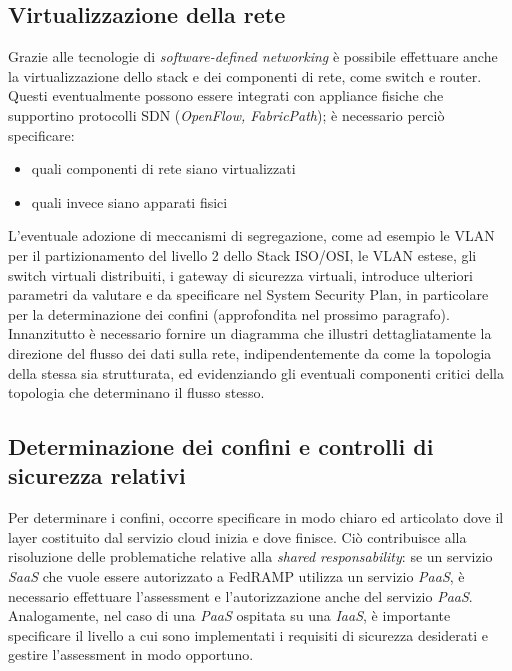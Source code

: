 \documentclass[../main.tex]{subfiles}
\begin{document}
\subsection{Virtualizzazione della rete}
Grazie alle tecnologie di \textit{software-defined networking} è possibile effettuare anche la virtualizzazione dello stack e dei componenti di rete, come switch e router. Questi eventualmente possono essere integrati con appliance fisiche che supportino protocolli SDN (\textit{OpenFlow, FabricPath}); è necessario perciò specificare:
\begin{itemize}
    \item quali componenti di rete siano virtualizzati
    \item quali invece siano apparati fisici
\end{itemize}
L'eventuale adozione di meccanismi di segregazione, come ad esempio le VLAN per il partizionamento del livello 2 dello Stack ISO/OSI, le VLAN estese, gli switch virtuali distribuiti, i gateway di sicurezza virtuali, introduce ulteriori parametri da valutare e da specificare nel System Security Plan, in particolare per la determinazione dei confini (approfondita nel prossimo paragrafo).
Innanzitutto è necessario fornire un diagramma che illustri dettagliatamente la direzione del flusso dei dati sulla rete, indipendentemente da come la topologia della stessa sia strutturata, ed evidenziando gli eventuali componenti critici della topologia che determinano il flusso stesso.


\subsection {Determinazione dei confini e controlli di sicurezza relativi}
Per determinare i confini, occorre specificare in modo chiaro ed articolato dove il layer costituito dal servizio cloud inizia e dove finisce.
Ciò contribuisce alla risoluzione delle problematiche relative alla \textit{shared responsability}: se un servizio \textit{SaaS} che vuole essere autorizzato a FedRAMP utilizza un servizio \textit{PaaS}, è necessario effettuare l'assessment e l'autorizzazione anche del servizio \textit{PaaS}.
Analogamente, nel caso di una \textit{PaaS} ospitata su una \textit{IaaS}, è importante specificare il livello a cui sono implementati i requisiti di sicurezza desiderati e gestire l'assessment in modo opportuno.
\end{document}
